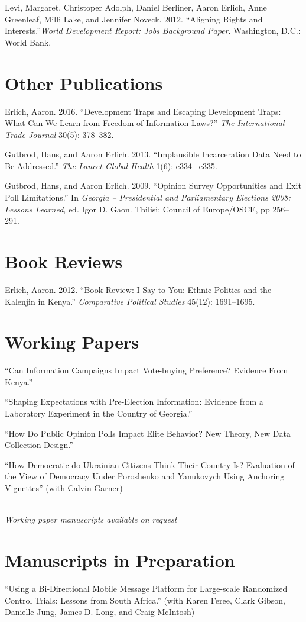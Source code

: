 \documentclass[margin,line]{res}
\begin{document}
{\begin{resume}
Levi, Margaret, Christoper Adolph, Daniel Berliner, Aaron Erlich, Anne
Greenleaf, Milli Lake, and Jennifer Noveck. 2012. ``Aligning Rights and
Interests.''\emph{World
  Development Report: Jobs Background Paper}. Washington, D.C.: World
Bank. 

\section{\sc  Other Publications}

Erlich, Aaron. 2016. ``Development Traps and Escaping Development
Traps: What Can We Learn from Freedom of Information Laws?'' \emph{The International Trade Journal }30(5): 378–382.

Gutbrod, Hans, and Aaron Erlich. 2013. ``Implausible Incarceration
Data Need to Be Addressed.'' \emph{The Lancet Global Health} 1(6):
e334-- e335.

Gutbrod, Hans, and Aaron Erlich. 2009. ``Opinion Survey Opportunities and Exit Poll
Limitations.'' In \emph{Georgia -- Presidential and Parliamentary
  Elections 2008: Lessons Learned}, ed. Igor D. Gaon. Tbilisi: Council
of Europe/OSCE, pp 256--291.
 
\section{\sc Book Reviews}
Erlich, Aaron. 2012. ``Book Review: I Say to You: Ethnic Politics and the Kalenjin in Kenya.'' \emph{Comparative Political Studies} 45(12): 1691--1695.

\section{\sc Working Papers}
``Can Information Campaigns Impact Vote-buying Preference? Evidence
From Kenya.'' 

``Shaping Expectations with Pre-Election Information:
Evidence from a Laboratory Experiment in the Country of Georgia.''

``How Do Public Opinion Polls Impact Elite Behavior? New Theory, New
Data Collection Design.''

``How Democratic do Ukrainian Citizens Think
Their Country Is? Evaluation of the View of Democracy Under Poroshenko and Yanukovych Using Anchoring Vignettes'' (with Calvin Garner)
\\
\\
\centerline{\emph{Working paper manuscripts available on request}}


\section{\sc Manuscripts in Preparation}
``Using a Bi-Directional Mobile Message Platform for Large-scale
Randomized Control Trials: Lessons from South Africa.'' (with Karen
Feree, Clark Gibson, Danielle
Jung, James D. Long, and Craig McIntosh)


\end{resume}}
\end{document}
